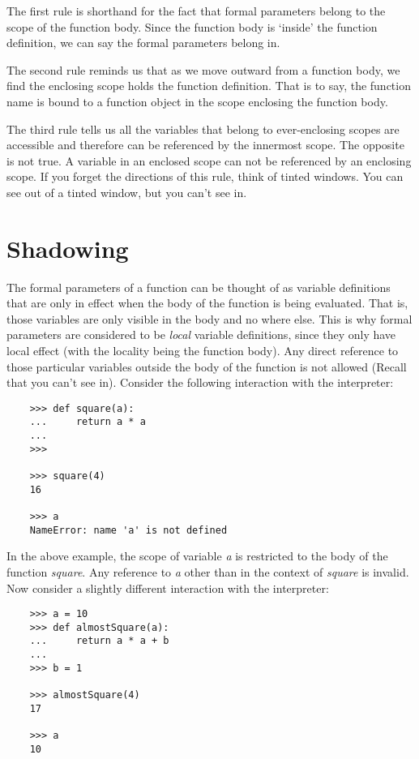 The first rule is shorthand for the fact that formal parameters
belong to the scope of the function body. Since the function body
is `inside' the function definition, we can say the formal parameters
belong in.

The second rule reminds us that as we move outward from a function body,
we find the enclosing scope holds the function definition. That is to
say, the function name is bound to a function object in the scope
enclosing the function body.

The third rule tells us all the variables that belong to 
ever-enclosing scopes are accessible and therefore
can be referenced by the innermost scope. The opposite is
not true. A variable in an enclosed scope can not be referenced
by an enclosing scope. If you forget the directions of this
rule, think of tinted windows. You can see out of a tinted
window, but you can't see in.

\section{Shadowing}

The formal parameters of a function can be thought of
as variable definitions that are only in effect when
the body of the function is being evaluated. That is,
those variables are only visible in the body and no where
else. This is why formal parameters are considered to be
{\it local} variable definitions, since they only have local
effect (with the locality being
the function body). Any direct reference to those
particular variables outside the body of the function
is not allowed (Recall that you can't see in).
Consider the following interaction with
the interpreter:

\begin{verbatim}
    >>> def square(a):
    ...     return a * a
    ...
    >>>
     
    >>> square(4)
    16
     
    >>> a
    NameError: name 'a' is not defined
\end{verbatim}


In the above example, the scope of variable {\it a} is restricted
to the body of the function {\it square}.
Any reference to
{\it a} other than in the context of {\it square} is invalid. Now
consider a slightly different interaction with the
interpreter:

\begin{verbatim}
    >>> a = 10
    >>> def almostSquare(a):
    ...     return a * a + b
    ...
    >>> b = 1
     
    >>> almostSquare(4)
    17

    >>> a
    10
\end{verbatim}

